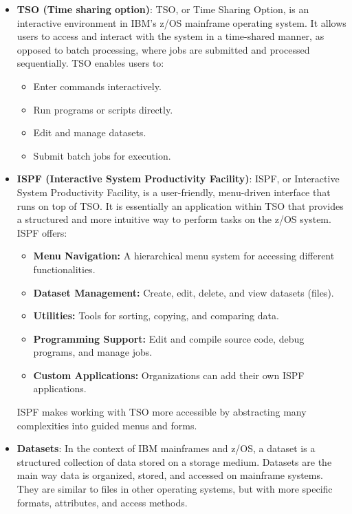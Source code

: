 \documentclass{report}
\begin{document}
\begin{itemize}
        \item \textbf{TSO (Time sharing option)}: TSO, or Time Sharing Option, is an interactive environment in IBM's z/OS mainframe operating system. It allows users to access and interact with the system in a time-shared manner, as opposed to batch processing, where jobs are submitted and processed sequentially. TSO enables users to:
            \begin{itemize}
                \item Enter commands interactively.
                \item Run programs or scripts directly.
                \item Edit and manage datasets.
                \item Submit batch jobs for execution.
            \end{itemize}
        \item \textbf{ISPF (Interactive System Productivity Facility)}: ISPF, or Interactive System Productivity Facility, is a user-friendly, menu-driven interface that runs on top of TSO. It is essentially an application within TSO that provides a structured and more intuitive way to perform tasks on the z/OS system. ISPF offers:
            \begin{itemize}
                \item \textbf{Menu Navigation:} A hierarchical menu system for accessing different functionalities.
                \item \textbf{Dataset Management:} Create, edit, delete, and view datasets (files).
                \item \textbf{Utilities:} Tools for sorting, copying, and comparing data.
                \item \textbf{Programming Support:} Edit and compile source code, debug programs, and manage jobs.
                \item \textbf{Custom Applications:} Organizations can add their own ISPF applications.
            \end{itemize}
            ISPF makes working with TSO more accessible by abstracting many complexities into guided menus and forms.
        \item \textbf{Datasets}: In the context of IBM mainframes and z/OS, a dataset is a structured collection of data stored on a storage medium. Datasets are the main way data is organized, stored, and accessed on mainframe systems. They are similar to files in other operating systems, but with more specific formats, attributes, and access methods.

\end{itemize}
\end{document}
